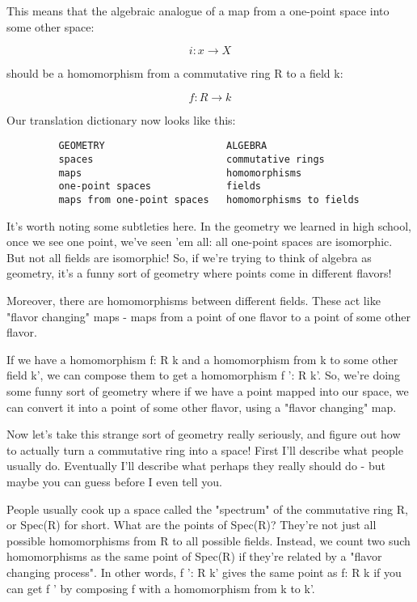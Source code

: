 This means that the algebraic analogue of a map from a one-point
space into some other space:

$$
i: {x} \to  X
$$
    
should be a homomorphism from a commutative ring R to a field k:

$$
f: R \to  k
$$
    

Our translation dictionary now looks like this:

\begin{verbatim}
         GEOMETRY                     ALGEBRA
         spaces                       commutative rings
         maps                         homomorphisms
         one-point spaces             fields
         maps from one-point spaces   homomorphisms to fields
\end{verbatim}
    
It's worth noting some subtleties here.  In the geometry we learned in 
high school, once we see one point, we've seen 'em all: all one-point 
spaces are isomorphic.  But not all fields are isomorphic!  So, if 
we're trying to think of algebra as geometry, it's a funny sort of 
geometry where points come in different flavors!  

Moreover, there are homomorphisms between different fields.  These
act like "flavor changing" maps - maps from a point of one flavor
to a point of some other flavor.

If we have a homomorphism f: R \to  k and a homomorphism from k to some 
other field k', we can compose them to get a homomorphism f ': R \to  k'.  
So, we're doing some funny sort of geometry where if we have a point 
mapped into our space, we can convert it into a point of some other 
flavor, using a "flavor changing" map.  

Now let's take this strange sort of geometry really seriously, and
figure out how to actually turn a commutative ring into a space! 
First I'll describe what people usually do.  Eventually I'll describe
what perhaps they really should do - but maybe you can guess before 
I even tell you.  

People usually cook up a space called the "spectrum" of the 
commutative
ring R, or Spec(R) for short.  What are the points of Spec(R)?
They're not just all possible homomorphisms from R to all possible 
fields.  Instead, we count two such homomorphisms as the same 
point of Spec(R) if they're related by a "flavor changing process".  
In other words, f ': R \to  k' gives the same point as f: R \to  k if you 
can get f ' by composing f with a homomorphism from k to k'.  

